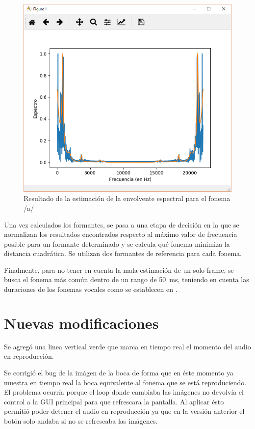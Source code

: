 \documentclass{article}
\begin{document}
\begin{figure}[H]
	\centering
	\includegraphics[width=15cm]{estimacion_LPC.PNG}
	\caption{Resultado de la estimación de la envolvente espectral para el fonema /a/}
	\label{fig_estimacion}
\end{figure}
 

Una vez calculados los formantes, se pasa a una etapa de decisión en la que se normalizan los resultados encontrados respecto al máximo valor de frecuencia posible para un formante determinado y se calcula qué fonema minimiza la distancia cuadrática. Se utilizan dos formantes de referencia para cada fonema.

Finalmente, para no tener en cuenta la mala estimación de un solo frame, se busca el fonema más común dentro de un rango de \SI{50}{ms}, teniendo en cuenta las duraciones de los fonemas vocales como se establecen en \cite{kuwabara1996acoustic}.
 

\section*{Nuevas modificaciones} \label{sec:nuevas-mejoras}

Se agregó una linea vertical verde que marca en tiempo real el momento del audio en reproducción.

Se corrigió el bug de la imágen de la boca de forma que en éste momento ya muestra en tiempo real la boca equivalente al fonema que se está reproduciendo.
El problema ocurría porque el loop donde cambiaba las imágenes no devolvía el control a la GUI principal para que refrescara la pantalla. Al aplicar ésto permitió poder detener el audio en reproducción ya que en la versión anterior el botón solo andaba si no se refrescaba las imágenes.
\end{document}
